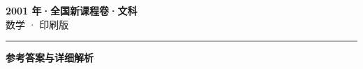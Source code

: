 \documentclass[zihao=5, a4paper]{ctexart}
\begin{document}
\begin{center}
  {\Large\bfseries 2001 年·全国新课程卷·文科}\\[4pt]
  {\large 数学 · 印刷版}
\end{center}
\medskip
{}

\par\bigskip\hrule\bigskip
{}
\begin{center}{\large\bfseries 参考答案与详细解析}\end{center}
\smallskip

\end{document}
